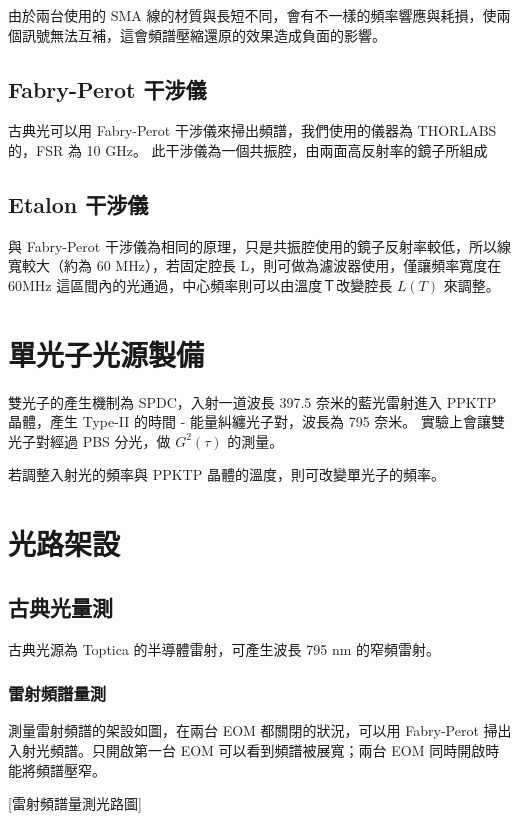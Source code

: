 \documentclass[class=NCU_thesis, crop=false]{standalone}
\begin{document}
由於兩台使用的 SMA 線的材質與長短不同，會有不一樣的頻率響應與耗損，使兩個訊號無法互補，這會頻譜壓縮還原的效果造成負面的影響。

\subsection{Fabry-Perot 干涉儀}
古典光可以用 Fabry-Perot 干涉儀來掃出頻譜，我們使用的儀器為 THORLABS 的，FSR 為 10 GHz。
此干涉儀為一個共振腔，由兩面高反射率的鏡子所組成

\subsection{Etalon 干涉儀}
與 Fabry-Perot 干涉儀為相同的原理，只是共振腔使用的鏡子反射率較低，所以線寬較大（約為 60 MHz），若固定腔長 L，則可做為濾波器使用，僅讓頻率寬度在 60MHz 這區間內的光通過，中心頻率則可以由溫度Ｔ改變腔長 $L(T)$ 來調整。

\section{單光子光源製備}
雙光子的產生機制為 SPDC，入射一道波長 397.5 奈米的藍光雷射進入 PPKTP 晶體，產生 Type-II 的時間 - 能量糾纏光子對，波長為 795 奈米。
實驗上會讓雙光子對經過 PBS 分光，做 $G^{2}(\tau)$ 的測量。

若調整入射光的頻率與 PPKTP 晶體的溫度，則可改變單光子的頻率。


\section{光路架設}
\subsection{古典光量測}
古典光源為 Toptica 的半導體雷射，可產生波長 795 nm 的窄頻雷射。

\subsubsection{雷射頻譜量測}
測量雷射頻譜的架設如圖，在兩台 EOM 都關閉的狀況，可以用 Fabry-Perot 掃出入射光頻譜。只開啟第一台 EOM 可以看到頻譜被展寬；兩台 EOM 同時開啟時能將頻譜壓窄。

[雷射頻譜量測光路圖]
\end{document}
